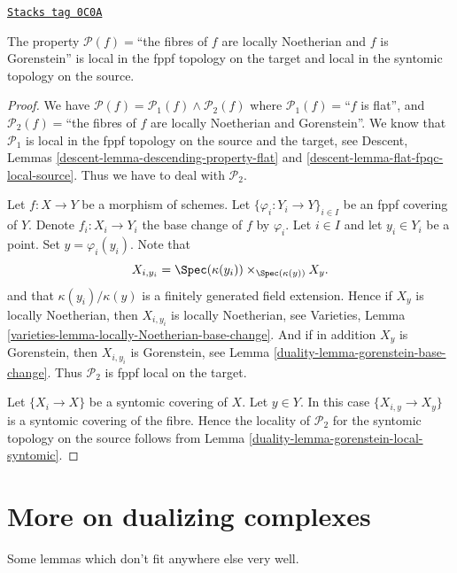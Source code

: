 \begin{lemma}
\label{duality-lemma-gorenstein-local-source-and-target}
\href{https://stacks.math.columbia.edu/tag/0C0A}{\texttt{Stacks tag 0C0A}}

The property
$\mathcal{P}(f)=$``the fibres of $f$ are locally Noetherian and $f$ is
Gorenstein'' is local in the fppf topology on the target and
local in the syntomic topology on the source.
\end{lemma}

\begin{proof}

We have
$\mathcal{P}(f) =
\mathcal{P}_1(f) \wedge \mathcal{P}_2(f)$
where
$\mathcal{P}_1(f)=$``$f$ is flat'', and
$\mathcal{P}_2(f)=$``the fibres of $f$ are locally Noetherian
and Gorenstein''.
We know that $\mathcal{P}_1$ is
local in the fppf topology on the source and the target, see
Descent, Lemmas \ref{descent-lemma-descending-property-flat} and
\ref{descent-lemma-flat-fpqc-local-source}. Thus we have to deal
with $\mathcal{P}_2$.

\medskip\noindent
Let $f : X \to Y$ be a morphism of schemes.
Let $\{\varphi_i : Y_i \to Y\}_{i \in I}$ be an fppf covering of $Y$.
Denote $f_i : X_i \to Y_i$ the base change of $f$ by $\varphi_i$.
Let $i \in I$ and let $y_i \in Y_i$ be a point.
Set $y = \varphi_i(y_i)$. Note that
$$
X_{i, y_i} = \Spec(\kappa(y_i)) \times_{\Spec(\kappa(y))} X_y.
$$
and that $\kappa(y_i)/\kappa(y)$ is a finitely generated field
extension. Hence if $X_y$ is locally Noetherian, then
$X_{i, y_i}$ is locally Noetherian, see
Varieties, Lemma \ref{varieties-lemma-locally-Noetherian-base-change}.
And if in addition $X_y$ is Gorenstein,
then $X_{i, y_i}$ is Gorenstein, see
Lemma \ref{duality-lemma-gorenstein-base-change}.
Thus $\mathcal{P}_2$ is fppf local on the target.

\medskip\noindent
Let $\{X_i \to X\}$ be a syntomic covering of $X$.
Let $y \in Y$. In this case $\{X_{i, y} \to X_y\}$ is a
syntomic covering of the fibre. Hence the locality of $\mathcal{P}_2$
for the syntomic topology on the source follows from
Lemma \ref{duality-lemma-gorenstein-local-syntomic}.
\end{proof}

\section{More on dualizing complexes}
\label{duality-section-more-dualizing}
Some lemmas which don't fit anywhere else very well.

